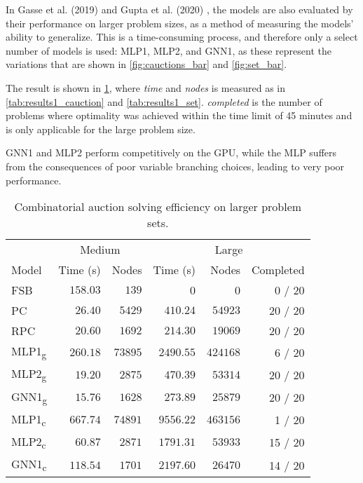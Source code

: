 In Gasse et al. (2019) \cite{gasse2019exact} and Gupta et al. (2020) \cite{gupta2020hybrid}, the models are also evaluated by their performance on larger problem sizes, as a method of measuring the models' ability to generalize.
This is a time-consuming process, and therefore only a select number of models is used: MLP1, MLP2, and GNN1, as these represent the variations that are shown in \cref{fig:cauctions_bar} and \cref{fig:set_bar}.

The result is shown in \cref{tab:results_trans_cauction}, where \textit{time} and \textit{nodes} is measured as in \cref{tab:results1_cauction} and \cref{tab:results1_set}.
\textit{completed} is the number of problems where optimality was achieved within the time limit of 45 minutes and is only applicable for the large problem size. 

GNN1 and MLP2 perform competitively on the \gls{GPU}, while the \gls{MLP} suffers from the consequences of poor variable branching choices, leading to very poor performance. 


\begin{scriptsize}
\begin{table}[ht]
	\centering
	\begin{tabular}{lrrrrr}
	    \toprule
		&  \multicolumn{2}{c}{Medium} & \multicolumn{3}{c}{Large}\\ \cmidrule(lr){2-3} \cmidrule(lr){4-6} 
		Model & Time (s) & Nodes & Time (s) & Nodes & Completed\\
		\midrule
		FSB &  $158.03$ & $139 $ & 0 & 0 & 0 / 20\\
		PC  &  $26.40 $ & $5429 $ & $410.24 $ & $54923 $ & 20 / 20\\
		RPC &  $20.60 $ & $1692 $ & $\mathbf{214.30} $ & $19069 $ & 20 / 20\\
		\addlinespace
		MLP1\textsubscript{g}  & $260.18$ & $73895$ & $2490.55$ & $424168$ & 6 / 20\\
		MLP2\textsubscript{g} &  $19.20$ & $2875$ & $470.39$ & $53314$ & 20 / 20\\
		GNN1\textsubscript{g} & $\mathbf{15.76}$ & $1628$ & $273.89$ & $25879$ & 20 / 20\\
		\addlinespace
		MLP1\textsubscript{c} &  $667.74 $ & $74891 $ & $9556.22 $ & $463156 $ & 1 / 20\\
		MLP2\textsubscript{c} &  $60.87 $ & $2871$ & $1791.31 $ & $53933 $ & 15 / 20\\
		GNN1\textsubscript{c} & $118.54 $ & $1701 $ & $2197.60 $ & $26470 $ & 14 / 20\\
		\bottomrule
	\end{tabular}
	\caption{Combinatorial auction solving efficiency on larger problem sets.}\label{tab:results_trans_cauction}
\end{table}
\end{scriptsize}
%


